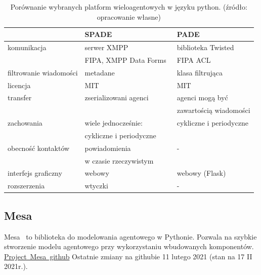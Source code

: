 \documentclass[11pt]{report}
\begin{document}
    \begin{table}[]
        \begin{tabular}{l|ll}
            & SPADE                                   & PADE                     \\ \hline
            komunikacja            & serwer XMPP                             & biblioteka Twisted       \\
            & FIPA, XMPP Data Forms~\cite{data_forms} & FIPA ACL~\cite{fipa_acl} \\ \hline
            filtrowanie wiadomości & metadane                                & klasa filtrująca         \\ \hline
            licencja               & MIT                                     & MIT                      \\ \hline
            transfer               & zserializowani agenci                   & agenci mogą być          \\
            &                                         & zawartością wiadomości   \\ \hline
            zachowania             & wiele jednocześnie:                     & cykliczne i periodyczne  \\
            & cykliczne i periodyczne \\ \hline
            obecność kontaktów     & powiadomienia                           & -                        \\
            & w czasie rzeczywistym \\ \hline
            interfejs graficzny    & webowy                                  & webowy (Flask)           \\ \hline
            rozszerzenia           & wtyczki                                 & -                        \\ \hline \hline
        \end{tabular}
        \caption{Porównanie wybranych platform wieloagentowych w języku python. (źródło: opracowanie własne)}
        \label{tab:porownanie}
    \end{table}

    \subsection{Mesa}
    Mesa~\cite{Masad2015} to biblioteka do modelowania agentowego w Pythonie.
    Pozwala na szybkie stworzenie modelu agentowego przy wykorzystaniu wbudowanych komponentów.
    \href{https://github.com/projectmesa/mesa}{Project~Mesa~github}
    Ostatnie zmiany na githubie 11 lutego 2021 (stan na 17 II 2021r.).
\end{document}

